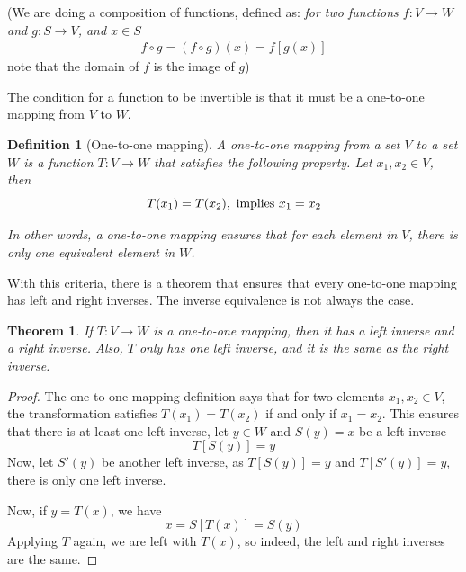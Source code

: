 \documentclass{book}
\newtheorem{theorem}{Theorem}[section]
\newtheorem{definition}{Definition}[section]
\begin{document}
(We are doing a composition of functions, defined as: \textit{for two
    functions $f: V\to W$ and $g: S \to V$, and $x\in S$}
\begin{equation}
    \begin{split}
        f\circ g = (f\circ g)(x) = f\left[g(x)\right]
    \end{split}
\end{equation}
note that the domain of $f$ is the image of $g$)

The condition for a function to be invertible is that it must be a one-to-one
mapping from $V$ to $W$.

\begin{definition}[One-to-one mapping]
    A one-to-one mapping from a set $V$ to a set $W$ is a function $T: V \to W$ that satisfies the following property.
    Let $x_1,x_2\in V$, then
    \begin{equation}
        T(x_1) = T(x_2), \textnormal{ implies } x_1 = x_2
    \end{equation}

    In other words, a one-to-one mapping ensures that for each element in $V$,
    there is only one equivalent element in $W$.
\end{definition}

With this criteria, there is a theorem that ensures that every one-to-one
mapping has left and right inverses. The inverse equivalence is not always the
case.

\begin{theorem}
    If $T:V \to W$ is a one-to-one mapping, then it has a left inverse and a right inverse. Also, $T$ only has one left inverse,
    and it is the same as the right inverse.
\end{theorem}

\begin{proof}
    The one-to-one mapping definition says that for two elements $x_1,x_2\in V$, the transformation
    satisfies $T(x_1) = T(x_2)$ if and only if $x_1=x_2$. This ensures that there is at least one left
    inverse, let $y\in W$ and $S(y)=x$ be a left inverse
    \begin{equation*}
        T\left[S(y)\right] = y
    \end{equation*}
    Now, let $S'(y)$ be another left inverse, as $T\left[S(y)\right] = y$ and $T\left[S'(y)\right] = y$,
    there is only one left inverse.

    Now, if $y=T(x)$, we have
    \begin{equation}
        x = S\left[T(x)\right] = S(y)
    \end{equation}
    Applying $T$ again, we are left with $T(x)$, so indeed, the left and right inverses are the same.
\end{proof}
\end{document}
